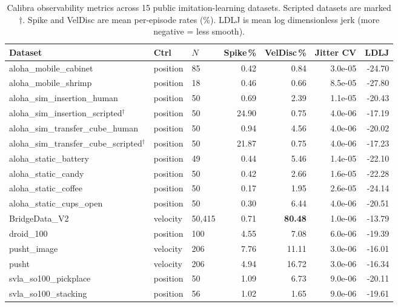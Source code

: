 \begin{table}[htbp]
\centering
\caption{Calibra observability metrics across 15 public imitation-learning datasets.
Scripted datasets are marked $\dagger$.
Spike and VelDisc are mean per-episode rates (\%).
LDLJ is mean log dimensionless jerk (more negative = less smooth).}
\label{tab:cross_dataset}
\small
\begin{tabular}{lllrrrr}
\toprule
Dataset & Ctrl & $N$ & Spike\,\% & VelDisc\,\% & Jitter CV & LDLJ \\
\midrule
aloha\_mobile\_cabinet          & position & 85     & 0.42  & 0.84  & 3.0e-05 & -24.70 \\
aloha\_mobile\_shrimp           & position & 18     & 0.46  & 0.66  & 8.5e-05 & -27.80 \\
aloha\_sim\_insertion\_human    & position & 50     & 0.69  & 2.39  & 1.1e-05 & -20.43 \\
aloha\_sim\_insertion\_scripted$^\dagger$ & position & 50 & 24.90 & 0.75 & 4.0e-06 & -17.19 \\
aloha\_sim\_transfer\_cube\_human & position & 50   & 0.94  & 4.56  & 4.0e-06 & -20.02 \\
aloha\_sim\_transfer\_cube\_scripted$^\dagger$ & position & 50 & 21.87 & 0.75 & 4.0e-06 & -17.23 \\
aloha\_static\_battery          & position & 49     & 0.44  & 5.46  & 1.4e-05 & -22.10 \\
aloha\_static\_candy            & position & 50     & 0.42  & 2.66  & 1.6e-05 & -22.28 \\
aloha\_static\_coffee           & position & 50     & 0.17  & 1.95  & 2.6e-05 & -24.14 \\
aloha\_static\_cups\_open       & position & 50     & 0.30  & 6.44  & 4.0e-06 & -20.51 \\
\midrule
BridgeData\_V2                  & velocity & 50{,}415 & 0.71 & \textbf{80.48} & 1.0e-06 & -13.79 \\
droid\_100                      & position & 100    & 4.55  & 7.08  & 6.0e-06 & -19.39 \\
pusht\_image                    & velocity & 206    & 7.76  & 11.11 & 3.0e-06 & -16.01 \\
pusht                           & velocity & 206    & 4.94  & 16.72 & 3.0e-06 & -16.34 \\
svla\_so100\_pickplace          & position & 50     & 1.09  & 6.73  & 9.0e-06 & -20.11 \\
svla\_so100\_stacking           & position & 56     & 1.02  & 1.65  & 9.0e-06 & -19.61 \\
\bottomrule
\end{tabular}
\end{table}
